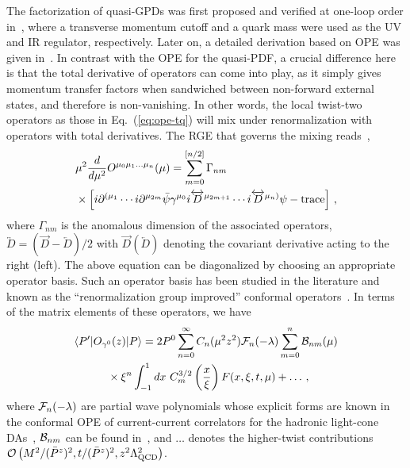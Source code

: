The factorization of quasi-GPDs was first proposed and verified at one-loop order in~\cite{Ji:2015qla,Xiong:2015nua}, where a transverse momentum cutoff and a quark mass were used as the UV and IR regulator, respectively. Later on, a detailed derivation based on OPE was given in~\cite{Liu:2019urm}. In contrast with the OPE for the quasi-PDF, a crucial difference here is that the total derivative of operators can come into play, as it simply gives momentum transfer factors when sandwiched between non-forward external states, and therefore is non-vanishing. In other words, the local twist-two operators as those in Eq.~(\ref{eq:ope-tq}) will mix under renormalization with operators with total derivatives.
%
The RGE that governs the mixing reads~\cite{Braun:2003rp},
\begin{align} \label{eq:rge}
	&\mu^2 {d\over d\mu^2}O^{{\mu}_0 {\mu}_1 \ldots {\mu}_n}(\mu) = \sum_{m=0}^{[n/2]}\Gamma_{nm}\\
	&\times\left[i\partial^{(\mu_1}\cdots i\partial^{\mu_{2m}} \bar{\psi} \gamma^{\mu_0}i\overleftrightarrow{D}^{\mu_{2m+1}}\cdots i\overleftrightarrow{D}^{\mu_n)}\psi-{\rm trace}\right]\,,\nonumber
\end{align}
where $\Gamma_{nm}$ is the anomalous dimension of the associated operators, $\overleftrightarrow{D}=(\overrightarrow{D}-\overleftarrow{D})/2$ with $\overrightarrow{D} (\overleftarrow{D})$ denoting the covariant derivative acting to the right (left). The above equation can be diagonalized by choosing an appropriate operator basis. Such an operator basis has been studied in the literature and known as the ``renormalization group improved'' conformal operators~\cite{Braun:2003rp,Mueller:1993hg}. In terms of the matrix elements of these operators, we have
\begin{align}\label{eq:ope-twist2}
	&\langle P'|{O}_{\gamma^0}(z)|P\rangle  =  2P^0\sum_{n=0}^\infty C_n ({\mu}^2 z^2){\cal F}_n(-\lambda)\sum_{m=0}^n{\cal B}_{nm}(\mu)\nonumber\\
	&\hspace{3em}\times\xi^n\int_{-1}^1 dx\ C_m^{3/2}\left({x\over \xi}\right) F(x,\xi,t,\mu)+\ldots\,,
\end{align}
where ${\cal F}_n(-\lambda)$
are partial wave polynomials whose explicit forms are known in the conformal OPE of current-current correlators for the hadronic light-cone DAs~\cite{Braun:2007wv}, ${\cal B}_{nm}$ can be found in~\cite{Braun:2003rp,Mueller:1993hg}, and $\ldots$ denotes the higher-twist contributions $\mathcal{O}\left({M^2/ ({\bar P}^z)^2},{t/ ({\bar P}^z)^2},z^2\Lambda_{\rm QCD}^2\right)$.

